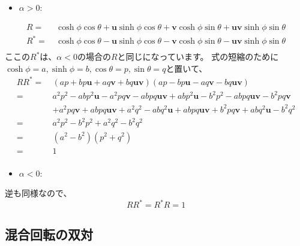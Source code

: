 \documentclass[a4paper,12pt,notitlepage]{jsreport}
\begin{document}
\begin{itemize}
  \item $ \alpha > 0: $
\end{itemize}
\begin{equation}
  \begin{split}
    R = ~ & \cosh \phi \cos \theta + \bm{u} \sinh \phi \cos \theta 
    + \bm{v} \cosh \phi \sin \theta + \bm{u} \bm{v} \sinh \phi \sin \theta \\
    R^* = ~ & \cosh \phi \cos \theta - \bm{u} \sinh \phi \cos \theta 
    - \bm{v} \cosh \phi \sin \theta - \bm{u} \bm{v} \sinh \phi \sin \theta \\
  \end{split}
\end{equation}
ここの$ R^* $は、$ \alpha < 0 $の場合の$ R $と同じになっています。
式の短縮のために$\cosh \phi = a, \sinh \phi = b, \cos \theta = p, \sin \theta = q$と置いて、
\begin{equation}
  \begin{split}
    R R^* = ~ & (a p + b p \bm{u} + a q \bm{v} + b q \bm{u} \bm{v})
    (a p - b p \bm{u} - a q \bm{v} - b q \bm{u} \bm{v}) \\
    = ~ & a^2 p^2 - a b p^2 \bm{u} - a^2 p q \bm{v} - a b p q \bm{u} \bm{v}
    + a b p^2 \bm{u} - b^2 p^2 - a b p q \bm{u} \bm{v} - b^2 p q \bm{v} \\
    & + a^2 p q \bm{v} + a b p q \bm{u} \bm{v} + a^2 q^2 - a b q^2 \bm{u}
    + a b p q \bm{u} \bm{v} + b^2 p q \bm{v} + a b q^2 \bm{u} - b^2 q^2 \\
    = ~ & a^2 p^2 - b^2 p^2 + a^2 q^2 - b^2 q^2 \\
    = ~ & (a^2 - b^2) (p^2 + q^2) \\
    = ~ & 1 \\
  \end{split}
\end{equation}

\begin{itemize}
  \item $ \alpha < 0: $
\end{itemize}
逆も同様なので、
\begin{equation}
  R R^* = R^* R = 1
\end{equation}

\subsection{混合回転の双対}
\end{document}
